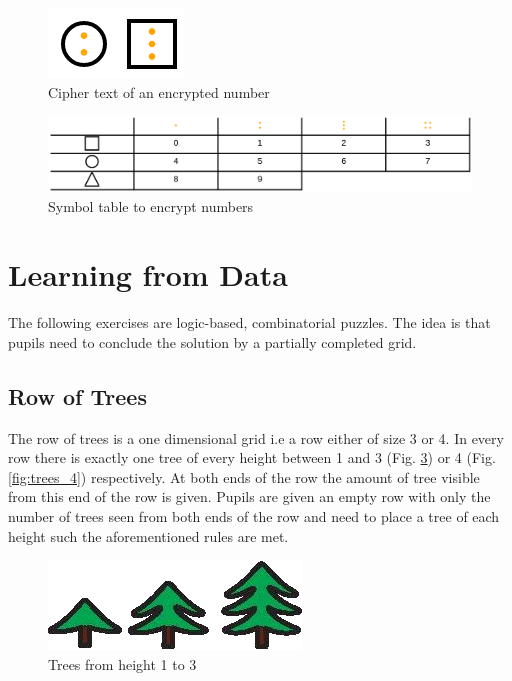 \begin{figure} 
    \centering
    \includegraphics[width=0.2 \columnwidth]{figures/cipher_number.png}
    \caption{Cipher text of an encrypted number} 
    \label{fig:cipher_number} 
\end{figure}

\begin{figure} 
    \centering
    \includegraphics[width=1.0 \columnwidth]{figures/symbol_table.png}
    \caption{Symbol table to encrypt numbers} 
    \label{fig:symbol_table} 
\end{figure}

\section{Learning from Data}

The following exercises are logic-based, combinatorial puzzles. The idea is that pupils need to conclude the solution by a partially completed grid.

\subsection{Row of Trees}

The row of trees is a one dimensional grid i.e a row either of size 3 or 4. In every row there is exactly one tree of every height between 1 and 3 (Fig. \ref{fig:trees_3}) or 4 (Fig. \ref{fig:trees_4}) respectively. At both ends of the row the amount of tree visible from this end of the row is given.
Pupils are given an empty row with only the number of trees seen from both ends of the row and need to place a tree of each height such the aforementioned rules are met.

\begin{figure} 
    \centering
    \includegraphics[width=0.4 \columnwidth]{figures/trees_3.png}
    \caption{Trees from height 1 to 3} 
    \label{fig:trees_3} 
\end{figure}

